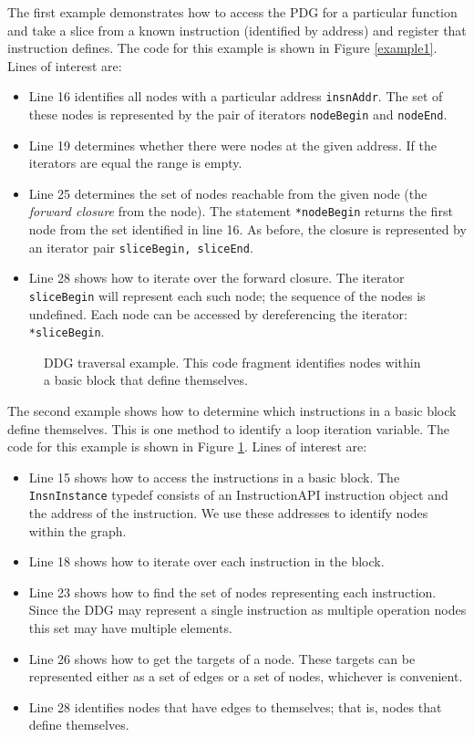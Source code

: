 \documentclass[12pt,titlepage]{article}
\begin{document}
The first example demonstrates how to access the PDG for a particular
function and take a slice from a known instruction (identified by
address) and register that instruction defines. The code for this
example is shown in Figure \ref{example1}. Lines of interest are:
\begin{itemize}
\item Line 16 identifies all nodes with a particular address
  \texttt{insnAddr}. The set of these nodes is represented by the pair
  of iterators \texttt{nodeBegin} and \texttt{nodeEnd}.
\item Line 19 determines whether there were nodes at the given
  address. If the iterators are equal the range is empty.
\item Line 25 determines the set of nodes reachable from the given
  node (the \emph{forward closure} from the node). The statement
  \texttt{*nodeBegin} returns the first node from the set identified
  in line 16. As before, the closure is represented by an iterator
  pair \texttt{sliceBegin, sliceEnd}. 
\item Line 28 shows how to iterate over the forward closure. The
  iterator \texttt{sliceBegin} will represent each such node; the
  sequence of the nodes is undefined. Each node can be accessed by
  dereferencing the iterator: \texttt{*sliceBegin}.
\end{itemize}

\begin{figure}

\caption{DDG traversal example. This code fragment identifies nodes
  within a basic block that define themselves.}
\label{example2}
\end{figure}

The second example shows how to determine which instructions in a
basic block define themselves. This is one method to identify a loop
iteration variable. The code for this example is shown in Figure
\ref{example2}. Lines of interest are:
\begin{itemize}
\item Line 15 shows how to access the instructions in a basic
  block. The \texttt{InsnInstance} typedef consists of an
  InstructionAPI instruction object and the address of the
  instruction. We use these addresses to identify nodes within the
  graph.
\item Line 18 shows how to iterate over each instruction in the block.
\item Line 23 shows how to find the set of nodes representing each
  instruction. Since the DDG may represent a single instruction as
  multiple operation nodes this set may have multiple elements. 
\item Line 26 shows how to get the targets of a node. These targets
  can be represented either as a set of edges or a set of nodes,
  whichever is convenient. 
\item Line 28 identifies nodes that have edges to themselves; that is,
  nodes that define themselves. 
\end{itemize}
\end{document}
